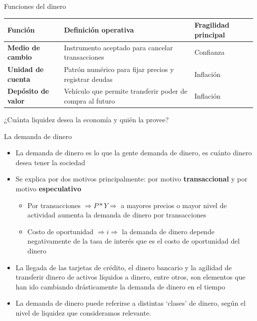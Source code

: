 \documentclass{beamer}
\begin{document}
\begin{frame}{Funciones del dinero}
    \small
    \begin{center}
    \begin{tabular}{@{}p{} p{} p{}@{}}
    \toprule
    \textbf{Función} & \textbf{Definición operativa} & \textbf{Fragilidad principal} \\
    \midrule
    \textbf{\alert{Medio de cambio}} & Instrumento aceptado para cancelar transacciones & Confianza \\
    \textbf{\alert{Unidad de cuenta}} & Patrón numérico para fijar precios y registrar deudas & Inflación \\
    \textbf{\alert{Depósito de valor}} & Vehículo que permite transferir poder de compra al futuro & Inflación \\
    \bottomrule
    \end{tabular}
    \end{center}
    \small
    \begin{boxA}
        \centering
        ¿Cuánta liquidez desea la economía y quién la provee?
    \end{boxA}
\end{frame}


\begin{frame}{La demanda de dinero}
    \begin{itemize}
        \item La demanda de dinero es lo que la gente demanda de dinero, es cuánto dinero desea tener la sociedad
        \item Se explica por dos motivos principalmente: por motivo \textbf{transaccional} y por motivo \textbf{especulativo}
        \begin{itemize}
        \item Por transacciones $\Rightarrow P*Y \Rightarrow$ a mayores precios o mayor nivel de actividad aumenta la demanda de dinero por transacciones
        \item Costo de oportunidad $\Rightarrow i \Rightarrow $ la demanda de dinero depende negativamente de la tasa de interés que es el costo de oportunidad del dinero
    \end{itemize}
    \item La llegada de las tarjetas de crédito, el dinero bancario y la agilidad de transferir dinero de activos líquidos a dinero, entre otros, son elementos que han ido cambiando drásticamente la demanda de dinero en el tiempo
    \item La demanda de dinero puede referirse a distintas ‘clases’ de dinero, según el nivel de liquidez que consideramos relevante.
    \end{itemize}
\end{frame}
\end{document}
